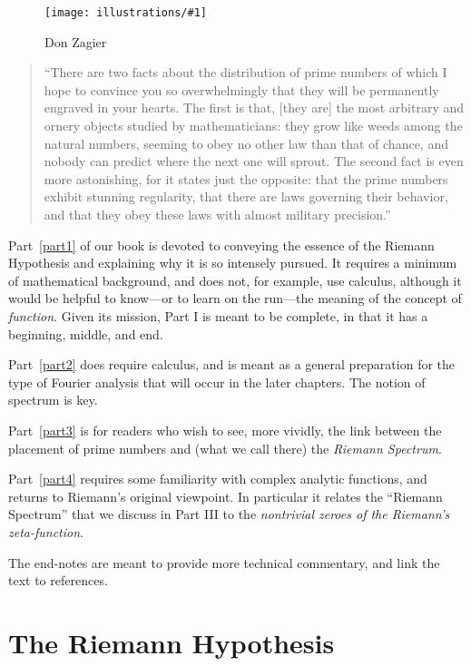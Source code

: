 \documentclass[openany]{book}
\newcommand{\ill}[3]{%
   \begin{figure}[H]%
   \vspace{-2ex}
   \centering%
   \texttt{[image: illustrations/\#1]}%
   \caption{#3}%
   \vspace{-2ex}
    \end{figure}}
\theoremstyle{plain}
\theoremstyle{definition}
\newcommand{\RH}{Riemann Hypothesis\index{Riemann Hypothesis}}
\begin{document}
\ill{zagier}{.25}{Don Zagier}


\begin{quote}
  ``There are two facts about the distribution of prime numbers of
  which I hope to convince you so overwhelmingly that they will be
  permanently engraved in your hearts. The first is that, [they are]
  the most arbitrary and ornery objects studied by mathematicians:
  they grow like weeds among the natural numbers, seeming to obey no
  other law than that of chance, and nobody can predict where the next
  one will sprout. The second fact is even more astonishing, for it
  states just the opposite: that the prime numbers exhibit stunning
  regularity, that there are laws governing their behavior, and that
  they obey these laws with almost military precision.''
\end{quote}

  Part~\ref{part1} of our book is devoted to conveying the essence of the Riemann Hypothesis and explaining why it is so intensely pursued. It requires a minimum of mathematical background, and does not,  for example, use calculus, although it would be helpful to know---or to learn on the run---the meaning of  the concept of {\it function}. Given its mission, Part I is meant to be complete, in that it has a beginning, middle, and end.

    Part~\ref{part2} does require calculus, and is meant as a general preparation for the type of Fourier analysis that will occur in the later chapters. The notion of spectrum is key.

    Part~\ref{part3} is for readers who wish to see, more vividly, the link between the placement of prime numbers and (what we call there) the {\it Riemann Spectrum}.

    Part~\ref{part4} requires some familiarity with complex analytic functions, and returns to Riemann's original viewpoint.  In particular it  relates the ``Riemann Spectrum'' that we discuss in Part III to the {\it nontrivial zeroes of the Riemann's zeta-function}.

      The end-notes are meant to provide  more technical commentary, and link the text to references.


\part{The \RH{}\label{part1}}

\end{document}
